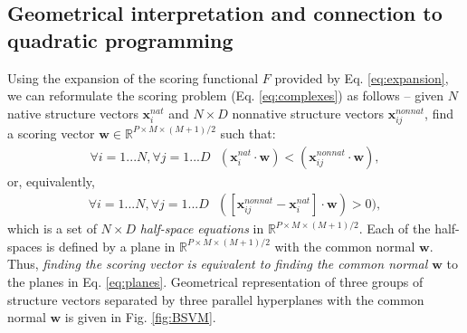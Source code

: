 \subsection{Geometrical interpretation and connection to quadratic programming}
Using the expansion of the scoring functional $F$ provided by Eq. \ref{eq:expansion}, we can reformulate the scoring problem (Eq. \ref{eq:complexes}) as follows -- 
given $N$ native structure vectors $\mathbf{x}_{i}^{nat}$ and $N \times D$ nonnative structure vectors $\mathbf{x}_{ij}^{nonnat}$, find a scoring 
vector $\mathbf{w} \in  \mathbb{R}^{P \times M \times (M+1)/2}$ such that:
\begin{eqnarray}
\forall i=1...N, \forall j=1...D ~~~(\mathbf{x}_{i}^{nat} \cdot \mathbf{w})<(\mathbf{x}_{ij}^{nonnat} \cdot \mathbf{w}),
\end{eqnarray}
or, equivalently,  
\begin{eqnarray}
\label{eq:planes}
\forall i=1...N, \forall j=1...D ~~~([\mathbf{x}_{ij}^{nonnat}-\mathbf{x}_{i}^{nat}] \cdot \mathbf{w})>0),
\end{eqnarray}
%
which is a set of $N \times D$ \emph{half-space equations} in $\mathbb{R}^{P \times M \times (M+1)/2}$. Each of the half-spaces is 
defined by a plane in   $\mathbb{R}^{P \times M \times (M+1)/2}$ with the common normal $ \mathbf{w}$. Thus, \emph{finding the scoring 
vector is equivalent to finding the common normal $ \mathbf{w}$} to the planes in 
Eq. \ref{eq:planes}.
Geometrical representation of three groups of  structure vectors separated by three parallel hyperplanes with the common normal  $ \mathbf{w}$ is given 
in Fig. \ref{fig:BSVM}.

